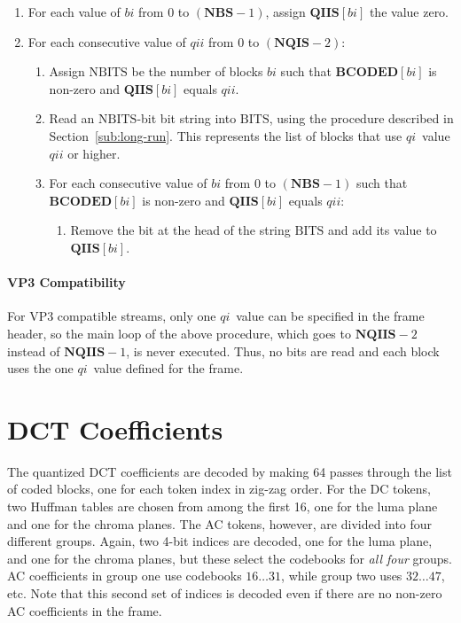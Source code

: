 \documentclass[9pt,letterpaper]{book}
\newcommand{\idx}[1]{{\ensuremath{\mathit{#1}}}}
\newcommand{\qi}{\idx{qi}}
\newcommand{\bi}{\idx{bi}}
\newcommand{\qii}{\idx{qii}}
\newcommand{\bitvar}[1]{\ensuremath{\mathbf{\bm{#1}}}}
\newcommand{\locvar}[1]{\ensuremath{\mathrm{#1}}}
\numberwithin{equation}{chapter}
\numberwithin{figure}{chapter}
\numberwithin{table}{chapter}
\begin{document}
\begin{enumerate}
\item
For each value of \locvar{\bi} from 0 to $(\bitvar{NBS}-1)$, assign
 $\bitvar{QIIS}[\locvar{\bi}]$ the value zero.
\item
For each consecutive value of \locvar{\qii} from 0 to $(\bitvar{NQIS}-2)$:
\begin{enumerate}
\item
Assign \locvar{NBITS} be the number of blocks \locvar{\bi} such that
 $\bitvar{BCODED}[\locvar{\bi}]$ is non-zero and $\bitvar{QIIS}[\locvar{\bi}]$
 equals $\locvar{\qii}$.
\item
Read an \locvar{NBITS}-bit bit string into \locvar{BITS}, using the procedure
 described in Section~\ref{sub:long-run}.
This represents the list of blocks that use \qi\ value \locvar{\qii} or higher.
\item
For each consecutive value of \locvar{\bi} from 0 to $(\bitvar{NBS}-1)$ such
 that $\bitvar{BCODED}[\locvar{\bi}]$ is non-zero and
 $\bitvar{QIIS}[\locvar{\bi}]$ equals $\locvar{\qii}$:
\begin{enumerate}
\item
Remove the bit at the head of the string \locvar{BITS} and add its value to
 $\bitvar{QIIS}[\locvar{\bi}]$.
\end{enumerate}
\end{enumerate}
\end{enumerate}

\paragraph{VP3 Compatibility}

For VP3 compatible streams, only one \qi\ value can be specified in the frame
 header, so the main loop of the above procedure, which goes to
 $\bitvar{NQIIS}-2$ instead of $\bitvar{NQIIS}-1$, is never executed.
Thus, no bits are read and each block uses the one \qi\ value defined for the
 frame.

\cleardoublepage

\section{DCT Coefficients}
\label{sec:dct-decode}

The quantized DCT coefficients are decoded by making 64 passes through the list
 of coded blocks, one for each token index in zig-zag order.
For the DC tokens, two Huffman tables are chosen from among the first 16, one
 for the luma plane and one for the chroma planes.
The AC tokens, however, are divided into four different groups.
Again, two 4-bit indices are decoded, one for the luma plane, and one for the
 chroma planes, but these select the codebooks for {\em all four} groups.
AC coefficients in group one use codebooks $16\ldots 31$, while group two uses
 $32\ldots 47$, etc.
Note that this second set of indices is decoded even if there are no non-zero
 AC coefficients in the frame.
\end{document}
